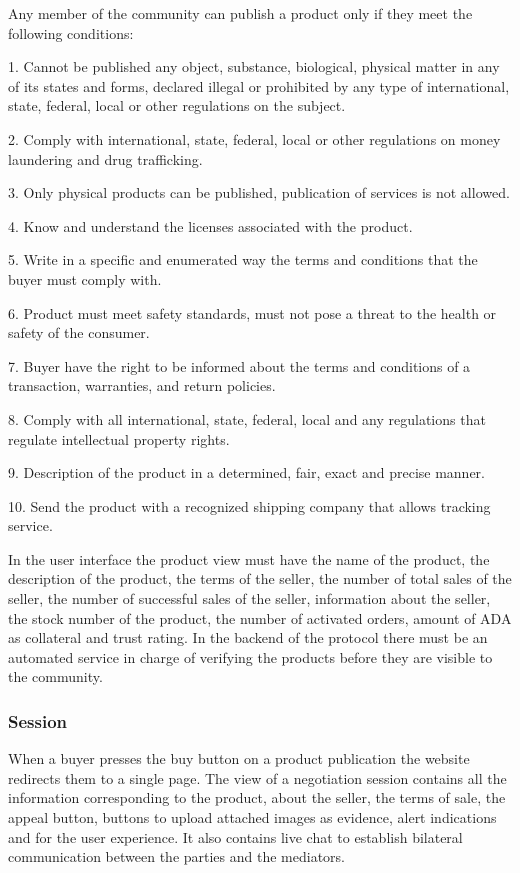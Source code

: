\documentclass[12pt]{article}
\begin{document}
Any member of the community can publish a product only if they meet the following conditions:

1. Cannot be published any object, substance, biological, physical matter in any of its states and forms, declared illegal or prohibited by any type of international, state, federal, local or other regulations on the subject.

2. Comply with international, state, federal, local or other regulations on money laundering and drug trafficking.

3. Only physical products can be published, publication of services is not allowed.

4. Know and understand the licenses associated with the product.

5. Write in a specific and enumerated way the terms and conditions that the buyer must comply with.

6. Product must meet safety standards, must not pose a threat to the health or safety of the consumer.

7. Buyer have the right to be informed about the terms and conditions of a transaction, warranties, and return policies.

8. Comply with all international, state, federal, local and any regulations that regulate intellectual property rights.

9. Description of the product in a determined, fair, exact and precise manner.

10. Send the product with a recognized shipping company that allows tracking service.

In the user interface the product view must have the name of the product, the description of the product, the terms of the seller, the number of total sales of the seller, the number of successful sales of the seller, information about the seller, the stock number of the product, the number of activated orders, amount of ADA as collateral and trust rating. In the backend of the protocol there must be an automated service in charge of verifying the products before they are visible to the community.


\subsubsection { Session } 

When a buyer presses the buy button on a product publication the website redirects them to a single page. The view of a negotiation session contains all the information corresponding to the product, about the seller, the terms of sale, the appeal button, buttons to upload attached images as evidence, alert indications and for the user experience. It also contains live chat to establish bilateral communication between the parties and the mediators.
\end{document}
